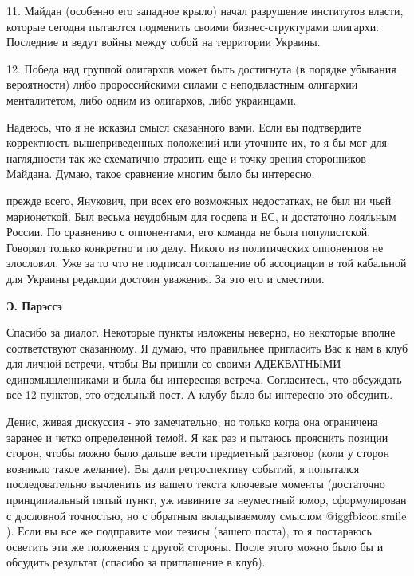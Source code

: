 \begin{itemize}
11. Майдан (особенно его западное крыло) начал разрушение институтов власти,
которые сегодня пытаются подменить своими бизнес-структурами олигархи.
Последние и ведут войны между собой на территории Украины.

12. Победа над группой олигархов может быть достигнута (в порядке убывания
вероятности) либо пророссийскими силами с неподвластным олигархии менталитетом,
либо одним из олигархов, либо украинцами.

Надеюсь, что я не исказил смысл сказанного вами. Если вы подтвердите
корректность вышеприведенных положений или уточните их, то я бы мог для
наглядности так же схематично отразить еще и точку зрения сторонников Майдана.
Думаю, такое сравнение многим было бы интересно.


прежде всего, Янукович, при всех его возможных недостатках, не был ни чьей
марионеткой. Был весьма неудобным для госдепа и ЕС, и достаточно лояльным
России. По сравнению с оппонентами, его команда не была популистской. Говорил
только конкретно и по делу. Никого из политических оппонентов не злословил. Уже
за то что не подписал соглашение об ассоциации в той кабальной для Украины
редакции достоин уважения. За это его и сместили.

\textbf{Э. Парэссэ} 

Спасибо за диалог. Некоторые пункты изложены неверно, но некоторые вполне
соответствуют сказанному. Я думаю, что правильнее пригласить Вас к нам в клуб
для личной встречи, чтобы Вы пришли со своими АДЕКВАТНЫМИ единомышленниками и
была бы интересная встреча. Согласитесь, что обсуждать все 12 пунктов, это
отдельный пост. А клубу было бы интересно это обсудить.


Денис, живая дискуссия - это замечательно, но только когда она ограничена
заранее и четко определенной темой. Я как раз и пытаюсь прояснить позиции
сторон, чтобы можно было дальше вести предметный разговор (коли у сторон
возникло такое желание). Вы дали ретроспективу событий, я попытался
последовательно вычленить из вашего текста ключевые моменты (достаточно
принципиальный пятый пункт, уж извините за неуместный юмор, сформулирован с
дословной точностью, но с обратным вкладываемому смыслом  @igg{fbicon.smile}  ). Если вы все же
подправите мои тезисы (вашего поста), то я постараюсь осветить эти же положения
с другой стороны. После этого можно было бы и обсудить результат (спасибо за
приглашение в клуб).


\end{itemize}
